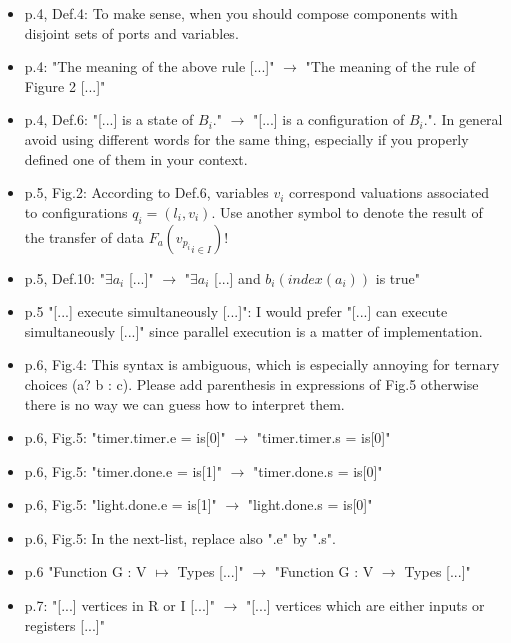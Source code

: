 \begin{itemize}
\item p.4, Def.4: To make sense, when you should compose components with disjoint 
sets of ports and variables.
\item p.4: "The meaning of the above rule [...]" $\rightarrow$ "The meaning of the rule of 
Figure 2 [...]"
\item p.4, Def.6: "[...] is a state of $B_i$." $\rightarrow$ "[...] is a configuration of 
$B_i$.". In general avoid using different words for the same thing, especially 
if you properly defined one of them in your context.
\done
{}


\item p.5, Fig.2: According to Def.6, variables $v_i$ correspond valuations 
associated to configurations $q_i = (l_i, v_i)$. Use another symbol to denote 
the result of the transfer of data $F_a({ v_{p_i} }_{i \in I})$!
\done

\item p.5, Def.10: "$\exists a_i$ [...]" $\rightarrow$ "$\exists a_i$ [...] and $b_i(index(a_i))$ is 
true"
\done

\item p.5 "[...] execute simultaneously [...]": I would prefer "[...] can execute 
simultaneously [...]" since parallel execution is a matter of implementation.
\done
{}

\item p.6, Fig.4: This syntax is ambiguous, which is especially annoying for 
ternary choices (a? b : c). Please add parenthesis in expressions of Fig.5 
otherwise there is no way we can guess how to interpret them.
\done

\item p.6, Fig.5: "timer.timer.e = is[0]" $\rightarrow$ "timer.timer.s = is[0]"
\done

\item p.6, Fig.5: "timer.done.e = is[1]" $\rightarrow$ "timer.done.s = is[0]"
\done

\item p.6, Fig.5: "light.done.e = is[1]" $\rightarrow$ "light.done.s = is[0]"
\done

\item p.6, Fig.5: In the next-list, replace also ".e" by ".s".
\done

\item p.6 "Function G : V $\mapsto$ Types [...]" $\rightarrow$ "Function G : V $\to$ Types 
[...]"
\done

\item p.7: "[...] vertices in R or I [...]" $\rightarrow$ "[...] vertices which are either 
inputs or registers [...]"
\done


\end{itemize}
